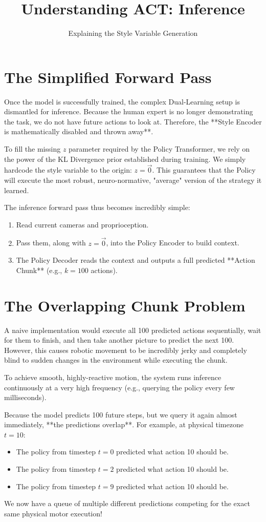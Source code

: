 \documentclass[11pt,a4paper]{article}
\title{\textbf{Understanding ACT: Inference}}
\author{Explaining the Style Variable Generation}
\date{\vspace{-5ex}}
\begin{document}
\maketitle

\section{The Simplified Forward Pass}
Once the model is successfully trained, the complex Dual-Learning setup is dismantled for inference. Because the human expert is no longer demonstrating the task, we do not have future actions to look at. Therefore, the **Style Encoder is mathematically disabled and thrown away**.

To fill the missing $z$ parameter required by the Policy Transformer, we rely on the power of the KL Divergence prior established during training. We simply hardcode the style variable to the origin: $z = \vec{0}$.
This guarantees that the Policy will execute the most robust, neuro-normative, "average" version of the strategy it learned. 

The inference forward pass thus becomes incredibly simple:
\begin{enumerate}
    \item Read current cameras and proprioception.
    \item Pass them, along with $z=\vec{0}$, into the Policy Encoder to build context.
    \item The Policy Decoder reads the context and outputs a full predicted **Action Chunk** (e.g., $k=100$ actions).
\end{enumerate}

\section{The Overlapping Chunk Problem}
A naive implementation would execute all 100 predicted actions sequentially, wait for them to finish, and then take another picture to predict the next 100. However, this causes robotic movement to be incredibly jerky and completely blind to sudden changes in the environment while executing the chunk.

To achieve smooth, highly-reactive motion, the system runs inference continuously at a very high frequency (e.g., querying the policy every few milliseconds). 

Because the model predicts 100 future steps, but we query it again almost immediately, **the predictions overlap**. For example, at physical timezone $t=10$:
\begin{itemize}
    \item The policy from timestep $t=0$ predicted what action 10 should be.
    \item The policy from timestep $t=2$ predicted what action 10 should be.
    \item The policy from timestep $t=9$ predicted what action 10 should be.
\end{itemize}
We now have a queue of multiple different predictions competing for the exact same physical motor execution!
\end{document}
